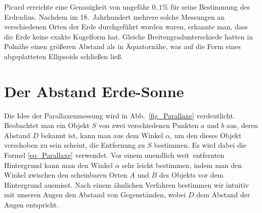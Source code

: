 Picard erreichte eine Genauigkeit von ungef\"ahr $0,1$\% f\"ur seine Bestimmung des Erdradius.
Nachdem im 18.\ Jahrhundert mehrere solche Messungen an verschiedenen Orten der Erde
durchgef\"uhrt worden waren, erkannte man, dass die Erde keine exakte Kugelform hat. Gleiche
Breitengradunterschiede hatten in Poln\"ahe einen gr\"o\ss eren Abstand als in \"Aquatorn\"ahe, was auf
die Form eines abgeplatteten Ellipsoids schlie\ss en lie\ss. 

\section{Der Abstand Erde-Sonne}

Die Idee der Parallaxenmessung wird in
Abb.\ \ref{fig_Parallaxe} verdeutlicht. Beobachtet man ein Objekt $S$ von zwei verschiedenen
Punkten $a$ und $b$ aus, deren Abstand $D$ bekannt ist, kann man aus dem Winkel $\alpha$,
um den dieses Objekt verschoben zu sein scheint, die Entfernung zu $S$ bestimmen. 
Es wird dabei die Formel \ref{eq_Parallaxe} verwendet. Vor einem \glqq unendlich weit\grqq\ entfernten
Hintergrund kann man den Winkel $\alpha$ sehr leicht bestimmen, indem man den Winkel zwischen den 
scheinbaren Orten $A$ und $B$ des Objekts vor dem Hintergrund ausmisst. 
Nach einem \"ahnlichen Verfahren bestimmen wir intuitiv mit unseren Augen den Abstand von
Gegenst\"anden, wobei $D$ dem Abstand der Augen entspricht.

